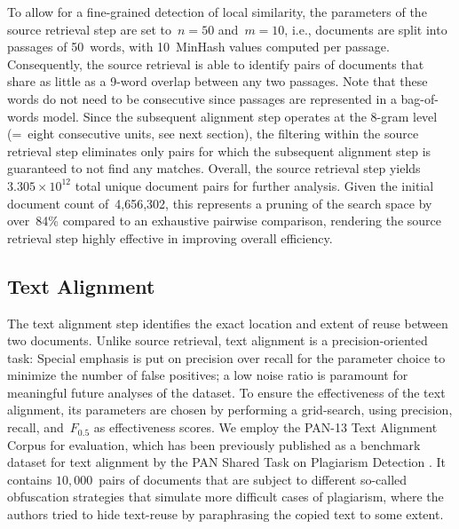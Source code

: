 \documentclass[fleqn,10pt]{wlscirep}
\begin{document}
To allow for a fine-grained detection of local similarity, the parameters of the source retrieval step are set to~$n=50$ and~$m=10$, i.e., documents are split into passages of 50~words, with 10~MinHash values computed per passage. Consequently, the source retrieval is able to identify pairs of documents that share as little as a 9-word overlap between any two passages. Note that these words do not need to be consecutive since passages are represented in a bag-of-words model. Since the subsequent alignment step operates at the 8-gram level (=~eight consecutive units, see next section), the filtering within the source retrieval step eliminates only pairs for which the subsequent alignment step is guaranteed to not find any matches. Overall, the source retrieval step yields~$3.305\times 10^{12}$ total unique document pairs for further analysis. Given the initial document count of~4,656,302, this represents a pruning of the search space by over~84\% compared to an exhaustive pairwise comparison, rendering the source retrieval step highly effective in improving overall efficiency.


\subsection*{Text Alignment}

The text alignment step identifies the exact location and extent of reuse between two documents. Unlike source retrieval, text alignment is a precision-oriented task: Special emphasis is put on precision over recall for the parameter choice to minimize the number of false positives; a low noise ratio is paramount for meaningful future analyses of the dataset. To ensure the effectiveness of the text alignment, its parameters are chosen by performing a grid-search, using precision, recall, and~$F_{0.5}$ as effectiveness scores. We employ the PAN-13 Text Alignment Corpus for evaluation, which has been previously published as a benchmark dataset for text alignment by the PAN Shared Task on Plagiarism Detection \cite{potthast:2013}. It contains $10,000$~pairs of documents that are subject to different so-called obfuscation strategies that simulate more difficult cases of plagiarism, where the authors tried to hide text-reuse by paraphrasing the copied text to some extent. 
\end{document}
